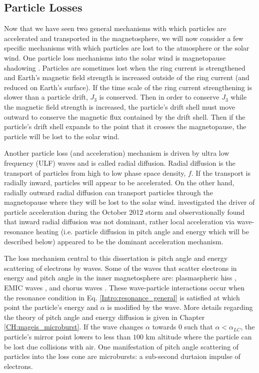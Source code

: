 \subsection{Particle Losses}\label{Intro:losses}
Now that we have seen two general mechanisms with which particles are accelerated and transported in the magnetosphere, we will now consider a few specific mechanisms with which particles are lost to the atmosphere or the solar wind. One particle loss mechanisms into the solar wind is magnetopause shadowing \citep[e.g.][]{Ukhorskiy2006}. Particles are sometimes lost when the ring current is strengthened and Earth's magnetic field strength is increased outside of the ring current (and reduced on Earth's surface). If the time scale of the ring current strengthening is slower than a particle drift, $J_3$ is conserved. Then in order to conserve $J_3$ while the magnetic field strength is increased, the particle's drift shell must move outward to conserve the magnetic flux contained by the drift shell. Then if the particle's drift shell expands to the point that it crosses the magnetopause, the particle will be lost to the solar wind.

Another particle loss (and acceleration) mechanism is driven by ultra low frequency (ULF) waves and is called radial diffusion. Radial diffusion is the transport of particles from high to low phase space density, $f$. If the transport is radially inward, particles will appear to be accelerated. On the other hand, radially outward radial diffusion can transport particles through the magnetopause where they will be lost to the solar wind. \citet{Reeves2013} investigated the driver of particle acceleration during the October 2012 storm and observationally found that inward radial diffusion was not dominant, rather local acceleration via wave-resonance heating (i.e. particle diffusion in pitch angle and energy which will be described below) appeared to be the dominant acceleration mechanism.

The loss mechanism central to this dissertation is pitch angle and energy scattering of electrons by waves. Some of the waves that scatter electrons in energy and pitch angle in the inner magnetosphere are: plasmaspheric hiss \citep[e.g.][]{O'Brien2014, Breneman2015}, EMIC waves \citep[e.g.][]{Hendry2017, Capannolo2019energetic}, and chorus waves \citep[e.g.][]{Breneman2017, Kasahara2018, Ozaki2019}. These wave-particle interactions occur when the resonance condition in Eq. \ref{Intro:resonance_general} is satisfied at which point the particle's energy and $\alpha$ is modified by the wave. More details regarding the theory of pitch angle and energy diffusion is given in Chapter \ref{CH:mageis_microburst}. If the wave changes $\alpha$ towards $0$ such that $\alpha < \alpha_{LC}$, the particle's mirror point lowers to less than $100$ km altitude where the particle can be lost due collisions with air. One manifestation of pitch angle scattering of particles into the loss cone are microbursts: a sub-second durtaion impulse of electrons.

